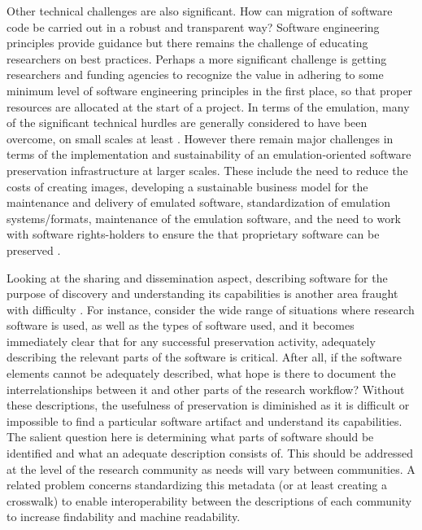 \documentclass[letterpaper,11pt]{article}
\begin{document}
Other technical challenges are also significant. How can migration of software code be carried out in a robust and transparent way? Software engineering principles provide guidance but there remains the challenge of educating researchers on best practices. Perhaps a more significant challenge is getting researchers and funding agencies to recognize the value in adhering to some minimum level of software engineering principles in the first place, so that proper resources are allocated at the start of a project. In terms of the emulation, many of the significant technical hurdles are generally considered to have been overcome, on small scales at least \citep{hong2014a,thain2015}. However there remain major challenges in terms of the implementation and sustainability of an emulation-oriented software preservation infrastructure at larger scales. These include the need to reduce the costs of creating images, developing a sustainable business model for the maintenance and delivery of emulated software, standardization of emulation systems/formats, maintenance of the emulation software, and the need to work with software rights-holders to ensure the that proprietary software can be preserved \citep{rosenthal2015}.

Looking at the sharing and dissemination aspect, describing software for the purpose of discovery and understanding its capabilities is another area fraught with difficulty \citep{lowood2004,hong2014a}. For instance, consider the wide range of situations where research software is used, as well as the types of software used, and it becomes immediately clear that for any successful preservation activity, adequately describing the relevant parts of the software is critical. After all, if the software elements cannot be adequately described, what hope is there to document the interrelationships between it and other parts of the research workflow? Without these descriptions, the usefulness of preservation is diminished as it is difficult or impossible to find a particular software artifact and understand its capabilities. The salient question here is determining what parts of software should be identified and what an adequate description consists of. This should be addressed at the level of the research community as needs will vary between communities. A related problem concerns standardizing this metadata (or at least creating a crosswalk) to enable interoperability between the descriptions of each community to increase findability and machine readability.
\end{document}
